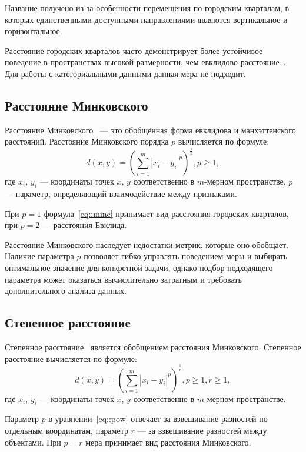 Название получено из-за особенности перемещения по городским кварталам, в которых единственными доступными направлениями являются вертикальное и горизонтальное. 

Расстояние городских кварталов часто демонстрирует более устойчивое поведение в пространствах высокой размерности, чем евклидово расстояние~\cite{Manch_Evklid}. Для работы с категориальными данными данная мера не подходит.

\subsection{Расстояние Минковского}
Расстояние Минковского~\cite{distances} --- это обобщённая форма евклидова и манхэттенского расстояний. Расстояние Минковского порядка $p$ вычисляется по формуле:
\begin{equation}
	d(x, y) = (\sum_{i=1}^m{|x_i - y_i|^p})^{\frac{1}{p}}, p \geqslant 1,
	\label{eq::minc}
\end{equation}
где $x_i$, $y_i$ --- координаты точек $x$, $y$ соответственно в $m$-мерном пространстве, $p$ --- параметр, определяющий взаимодействие между признаками.

При $p = 1$ формула~\ref{eq::minc} принимает вид расстояния городских кварталов, при $p = 2$ --- расстояния Евклида.

Расстояние Минковского наследует недостатки метрик, которые оно обобщает. Наличие параметра $p$ позволяет гибко управлять поведением меры и выбирать оптимальное значение для конкретной задачи, однако подбор подходящего параметра может оказаться вычислительно затратным и требовать дополнительного анализа данных.

\subsection{Степенное расстояние}
Степенное расстояние~\cite{Clast} является обобщением расстояния Минковского. Степенное расстояние вычисляется по формуле:
\begin{equation}
	d(x, y) = (\sum_{i=1}^m{|x_i - y_i|^p})^{\frac{1}{r}}, p \geqslant 1, r \geqslant 1,
	\label{eq::pow}
\end{equation}
где $x_i$, $y_i$ --- координаты точек $x$, $y$ соответственно в $m$-мерном пространстве.

Параметр $p$ в уравнении~\ref{eq::pow} отвечает за взвешивание разностей по отдельным координатам, параметр $r$ --- за взвешивание разностей между объектами. При $p = r$ мера принимает вид расстояния Минковского.

